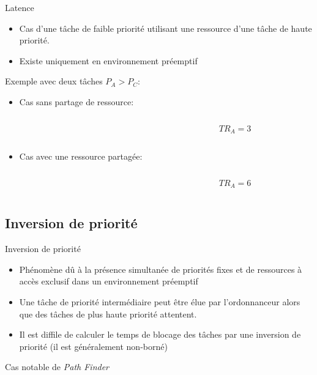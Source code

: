 \begin{frame}{Latence}
  \begin{itemize} 
  \item  Cas d'une tâche  de faible  priorité utilisant  une ressource
    d'une tâche de haute priorité.
  \item Existe uniquement en environnement préemptif
  \end{itemize} 
  Exemple avec deux tâches $P_A > P_C$:
  \begin{itemize} 
  \item Cas sans partage de ressource:
    \begin{columns}
      \begin{column}{6cm}
        \begin{center}
          
        \end{center}
      \end{column}
      \begin{column}{4cm}
        $$TR_A = 3$$
      \end{column}
    \end{columns}
  \item Cas avec une ressource partagée:
    \begin{columns}
      \begin{column}{6cm}
        \begin{center}
          
        \end{center}
      \end{column}
      \begin{column}{4cm}
        $$TR_A = 6$$
      \end{column}
    \end{columns}
  \end{itemize}     
\end{frame} 

\subsection{Inversion de priorité}

\begin{frame}{Inversion de priorité}
  \begin{itemize} 
  \item Phénomène dû à la présence simultanée de priorités fixes et de
    ressources à accès exclusif dans un environnement préemptif
  \item  Une  tâche  de  priorité  intermédiaire peut  être  élue  par
    l'ordonnanceur  alors  que  des  tâches  de  plus  haute  priorité
    attentent.
  \item Il est diffile de calculer  le temps de blocage des tâches par
    une inversion de priorité (il est généralement non-borné)
  \end{itemize} 
  Cas notable de \emph{Path Finder}
\end{frame}

